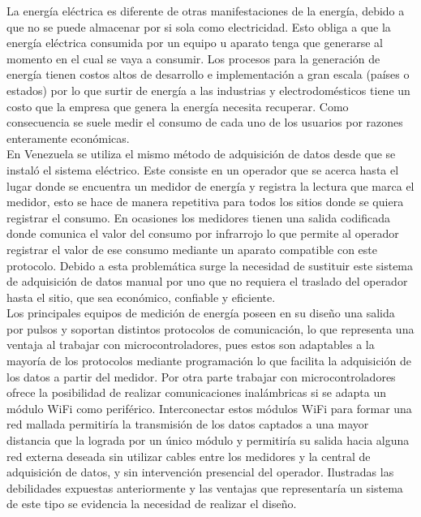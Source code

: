 \documentclass[12pt,letterpaper]{article}
\begin{document}
\vspace{0.3cm}

La energía eléctrica es diferente de otras manifestaciones de la energía, debido a que no se puede almacenar por si sola como electricidad. Esto obliga a que la energía eléctrica consumida por un equipo u aparato tenga que generarse al momento en el cual se vaya a consumir. Los procesos para la generación de energía tienen costos altos de desarrollo e implementación a gran escala (países o estados) por lo que surtir de energía a las industrias y electrodomésticos tiene un costo que la empresa que genera la energía necesita recuperar. Como consecuencia se suele medir el consumo de cada uno de los usuarios por razones enteramente económicas.\\


En Venezuela se utiliza el mismo método de adquisición de datos desde que se instaló el sistema eléctrico. Este consiste en un operador que se acerca hasta el lugar donde se encuentra un medidor de energía y registra la lectura que marca el medidor, esto se hace de manera repetitiva para todos los sitios donde se quiera registrar el consumo. En ocasiones los medidores tienen una salida codificada donde comunica el valor del consumo por infrarrojo lo que permite al operador registrar el valor de ese consumo mediante un aparato compatible con este protocolo. Debido a esta problemática surge la necesidad de sustituir este sistema de adquisición de datos manual por uno que no requiera el traslado del operador hasta el sitio, que sea económico, confiable y eficiente.\\


Los principales equipos de medición de energía poseen en su diseño una salida por pulsos y soportan distintos protocolos de comunicación, lo que representa una ventaja al trabajar con microcontroladores, pues estos son adaptables a la mayoría de los protocolos mediante programación lo que facilita la adquisición de los datos a partir del medidor. Por otra parte trabajar con microcontroladores ofrece la posibilidad de realizar comunicaciones inalámbricas si se adapta un módulo WiFi como periférico. Interconectar estos módulos WiFi para formar una red mallada permitiría la transmisión de los datos captados a una mayor distancia que la lograda por un único módulo y permitiría su salida hacia alguna red externa deseada sin utilizar cables entre los medidores y la central de adquisición de datos, y sin intervención presencial del operador. Ilustradas las debilidades expuestas anteriormente y las ventajas que representaría un sistema de este tipo se evidencia la necesidad de realizar el diseño.\\
\end{document}

